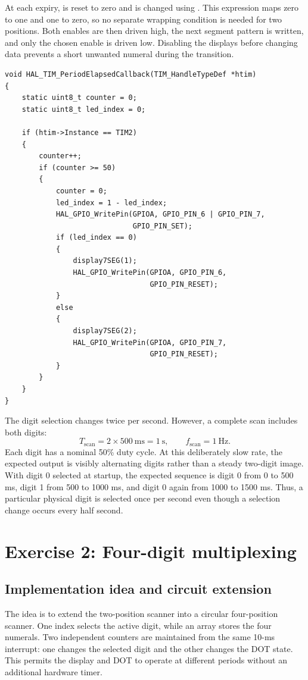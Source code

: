 \documentclass[a4paper]{article}
\newcommand{\code}[1]{\texttt{\detokenize{#1}}}
\newcommand{\topic}[1]{\subsection{#1}}
\begin{document}
At each expiry, \code{counter} is reset to zero and \code{led_index} is
changed using \code{1 - led_index}. This expression maps zero to one and one
to zero, so no separate wrapping condition is needed for two positions. Both
enables are then driven high, the next segment pattern is written, and only
the chosen enable is driven low. Disabling the displays before changing data
prevents a short unwanted numeral during the transition.
\par\noindent\begin{minipage}{\linewidth}
\begin{lstlisting}[caption={Two-digit timer callback}]
void HAL_TIM_PeriodElapsedCallback(TIM_HandleTypeDef *htim)
{
    static uint8_t counter = 0;
    static uint8_t led_index = 0;

    if (htim->Instance == TIM2)
    {
        counter++;
        if (counter >= 50)
        {
            counter = 0;
            led_index = 1 - led_index;
            HAL_GPIO_WritePin(GPIOA, GPIO_PIN_6 | GPIO_PIN_7,
                              GPIO_PIN_SET);
            if (led_index == 0)
            {
                display7SEG(1);
                HAL_GPIO_WritePin(GPIOA, GPIO_PIN_6,
                                  GPIO_PIN_RESET);
            }
            else
            {
                display7SEG(2);
                HAL_GPIO_WritePin(GPIOA, GPIO_PIN_7,
                                  GPIO_PIN_RESET);
            }
        }
    }
}
\end{lstlisting}
\end{minipage}\par
The digit selection changes twice per second. However, a complete scan includes
both digits:
\[
T_{\mathrm{scan}}=2\times500\ \mathrm{ms}=1\ \mathrm{s},\qquad
f_{\mathrm{scan}}=1\ \mathrm{Hz}.
\]
Each digit has a nominal 50\% duty cycle. At this deliberately slow rate, the
expected output is visibly alternating digits rather than a steady two-digit
image.
With digit 0 selected at startup, the expected sequence is digit 0 from
0 to 500 ms, digit 1 from 500 to 1000 ms, and digit 0 again from 1000 to
1500 ms. Thus, a particular physical digit is selected once per second even
though a selection change occurs every half second.

\section{Exercise 2: Four-digit multiplexing}
\topic{Implementation idea and circuit extension}
The idea is to extend the two-position scanner into a circular four-position
scanner. One index selects the active digit, while an array stores the four
numerals. Two independent counters are maintained from the same 10-ms
interrupt: one changes the selected digit and the other changes the DOT state.
This permits the display and DOT to operate at different periods without an
additional hardware timer.
\end{document}
